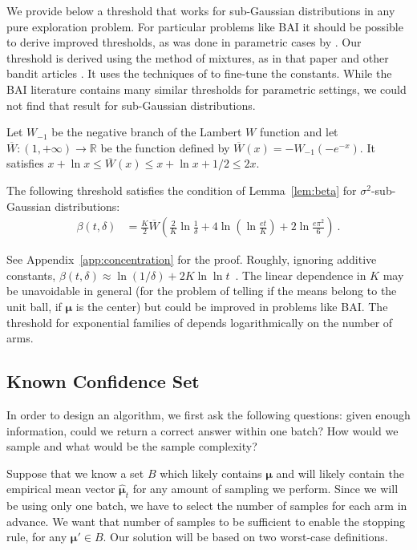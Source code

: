 We provide below a threshold that works for sub-Gaussian distributions in any pure exploration problem. For particular problems like BAI it should be possible to derive improved thresholds, as was done in parametric cases by \citet{kaufmannMixtureMartingalesRevisited2021}.
Our threshold is derived using the method of mixtures, as in that paper and other bandit articles \citep{abbasi2011improved}. It uses the techniques of \citep{degenneImpactStructureDesign2019} to fine-tune the constants.
While the BAI literature contains many similar thresholds for parametric settings, we could not find that result for sub-Gaussian distributions.

Let $W_{-1}$ be the negative branch of the Lambert $W$ function and let $\overline{W}:(1,+\infty) \to \mathbb{R}$ be the function defined by $\overline{W}(x) = -W_{-1}(-e^{-x})$. 
It satisfies $x + \ln x \le \overline{W}(x) \le x + \ln x + 1/2 \le 2x$.

\begin{lemma}\label{lem:beta_subG}
The following threshold satisfies the condition of Lemma~\ref{lem:beta} for $\sigma^2$-sub-Gaussian distributions:
\begin{align*}
\beta(t, \delta)
&= \frac{K}{2} \overline{W}\left(\frac{2}{K}\ln \frac{1}{\delta} + 4\ln \left(\ln \frac{et}{K}\right) + 2\ln \frac{e\pi^2}{6} \right)
\: .
\end{align*}
\end{lemma}

See Appendix~\ref{app:concentration} for the proof.
Roughly, ignoring additive constants, $\beta(t, \delta) \approx \ln(1/\delta) + 2K \ln\ln t$~.
The linear dependence in $K$ may be unavoidable in general (for the problem of telling if the means belong to the unit ball, if $\bm\mu$ is the center) but could be improved in problems like BAI. The threshold for exponential families of \citep{kaufmannMixtureMartingalesRevisited2021} depends logarithmically on the number of arms.



\subsection{Known Confidence Set}

In order to design an algorithm, we first ask the following questions: given enough information, could we return a correct answer within one batch? How would we sample and what would be the sample complexity?

Suppose that we know a set $B$ which likely contains $\bm\mu$ and will likely contain the empirical mean vector $\hat{\bm\mu}_t$ for any amount of sampling we perform.
Since we will be using only one batch, we have to select the number of samples for each arm in advance.
We want that number of samples to be sufficient to enable the stopping rule, for any $\bm\mu' \in B$.
Our solution will be based on two worst-case definitions.



